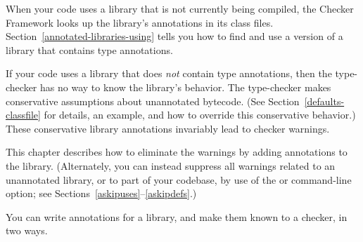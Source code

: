 \htmlhr
{}

When your code uses a library that is not currently being compiled,
the Checker Framework looks up the library's annotations in its class files.
Section~\ref{annotated-libraries-using} tells you how to find and use a
version of a library that contains type annotations.

If your code uses a library that does \emph{not} contain type annotations,
then the type-checker has no way to know the library's behavior.
The type-checker
makes conservative assumptions about unannotated bytecode.
(See
Section~\ref{defaults-classfile} for details, an example, and how to
override this conservative behavior.)
These conservative library
annotations invariably lead to checker warnings.

This chapter describes how to eliminate
the warnings by adding annotations to the library.
(Alternately, you can instead
suppress all warnings related to an unannotated library, or to part of your
codebase, by use of the
 or  command-line option; see
Sections~\ref{askipuses}--\ref{askipdefs}.)

You can write annotations for a library, and make them known to a checker, in two ways.

